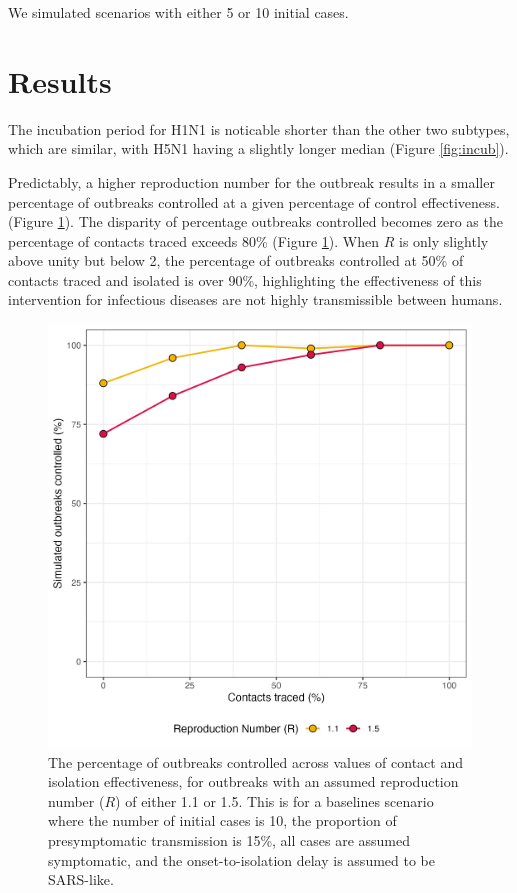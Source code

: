 \documentclass{article}
\begin{document}
We simulated scenarios with either 5 or 10 initial cases.

\section*{Results}

The incubation period for H1N1 is noticable shorter than the other two subtypes, which are similar, with H5N1 having a slightly longer median (Figure \ref{fig:incub}).

Predictably, a higher reproduction number for the outbreak results in a smaller percentage of outbreaks controlled at a given percentage of control effectiveness. (Figure \ref{fig:prop-outbreak-control-R}). The disparity of percentage outbreaks controlled becomes zero as the percentage of contacts traced exceeds 80\% (Figure \ref{fig:prop-outbreak-control-R}). When $R$ is only slightly above unity but below 2, the percentage of outbreaks controlled at 50\% of contacts traced and isolated is over 90\%, highlighting the effectiveness of this intervention for infectious diseases are not highly transmissible between humans.

\begin{figure}[ht]
\centering
\includegraphics[width=\textwidth]{../plots/prop_outbreak_control_reproduction_number.png}
\caption{The percentage of outbreaks controlled across values of contact and isolation effectiveness, for outbreaks with an assumed reproduction number ($R$) of either 1.1 or 1.5. This is for a baselines scenario where the number of initial cases is 10, the proportion of presymptomatic transmission is 15\%, all cases are assumed symptomatic, and the onset-to-isolation delay is assumed to be SARS-like.}
\label{fig:prop-outbreak-control-R}
\end{figure}
\end{document}
